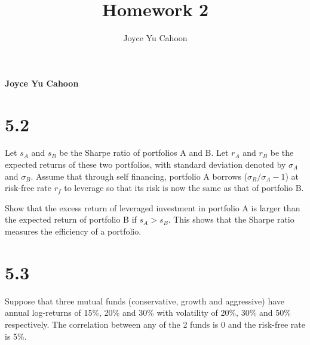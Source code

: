 \documentclass[11pt,]{article}
\title{Homework 2  }
\author{\Large Joyce Yu Cahoon\vspace{0.05in} \newline\normalsize\emph{}  }
\date{}
\newcommand*{\authorfont}{\fontfamily{phv}\selectfont}
\begin{document}
%

{%
\setlength{\parindent}{0pt}
\thispagestyle{plain}
{\fontsize{18}{20}\selectfont\raggedright 
\maketitle  %

}

{
  \vskip 13.5pt\relax \normalsize\fontsize{11}{12} 
  \textbf{\authorfont Joyce Yu Cahoon} \hskip 15pt \emph{\small }   
  
}

}






\vskip 6.5pt


\noindent  \hypertarget{section}{%
\section{5.2}\label{section}}

Let \(s_A\) and \(s_B\) be the Sharpe ratio of portfolios A and B. Let
\(r_A\) and \(r_B\) be the expected returns of these two portfolios,
with standard deviation denoted by \(\sigma_A\) and \(\sigma_B\). Assume
that through self financing, portfolio A borrows
(\(\sigma_B/\sigma_A-1\)) at risk-free rate \(r_f\) to leverage so that
its risk is now the same as that of portfolio B.

Show that the excess return of leveraged investment in portfolio A is
larger than the expected return of portfolio B if \(s_A > s_B\). This
shows that the Sharpe ratio measures the efficiency of a portfolio.

\hypertarget{section-1}{%
\section{5.3}\label{section-1}}

Suppose that three mutual funds (conservative, growth and aggressive)
have annual log-returns of 15\%, 20\% and 30\% with volatility of 20\%,
30\% and 50\% respectively. The correlation between any of the 2 funds
is 0 and the risk-free rate is 5\%.
\end{document}
